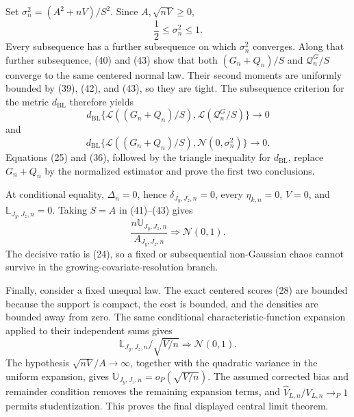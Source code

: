 Set \(\sigma_n^2=(A^2+nV)/S^2\).  Since \(A,\sqrt{nV}\ge0\),
\[
\frac12\le\sigma_n^2\le1.
\]
Every subsequence has a further subsequence on which \(\sigma_n^2\) converges.  Along that further subsequence, (40) and (43) show that both \((G_n+Q_n)/S\) and \(\mathcal Q_n^G/S\) converge to the same centered normal law.  Their second moments are uniformly bounded by (39), (42), and (43), so they are tight.  The subsequence criterion for the metric \(d_{\mathrm{BL}}\) therefore yields
\[
d_{\mathrm{BL}}\{\mathcal L((G_n+Q_n)/S),\mathcal L(\mathcal Q_n^G/S)\}\to0
\]
and
\[
d_{\mathrm{BL}}\{\mathcal L((G_n+Q_n)/S),\mathcal N(0,\sigma_n^2)\}\to0.
\]
Equations (25) and (36), followed by the triangle inequality for \(d_{\mathrm{BL}}\), replace \(G_n+Q_n\) by the normalized estimator and prove the first two conclusions.

At conditional equality, \(\Delta_n=0\), hence \(\delta_{J_y,J_z,n}=0\), every \(\eta_{k,n}=0\), \(V=0\), and \(\mathbb L_{J_y,J_z,n}=0\).  Taking \(S=A\) in (41)--(43) gives
\[
\frac{n\mathbb U_{J_y,J_z,n}}{A_{J_y,J_z,n}}\Rightarrow\mathcal N(0,1).
\]
The decisive ratio is (24), so a fixed or subsequential non-Gaussian chaos cannot survive in the growing-covariate-resolution branch.

Finally, consider a fixed unequal law.  The exact centered scores (28) are bounded because the support is compact, the cost is bounded, and the densities are bounded away from zero.  The same conditional characteristic-function expansion applied to their independent sums gives
\[
\mathbb L_{J_y,J_z,n}/\sqrt{V/n}\Rightarrow\mathcal N(0,1).
\]
The hypothesis \(\sqrt{nV}/A\to\infty\), together with the quadratic variance in the uniform expansion, gives
\(\mathbb U_{J_y,J_z,n}=o_P(\sqrt{V/n})\).  The assumed corrected bias and remainder condition removes the remaining expansion terms, and \(\widehat V_{L,n}/V_{L,n}\to_P1\) permits studentization.  This proves the final displayed central limit theorem.
